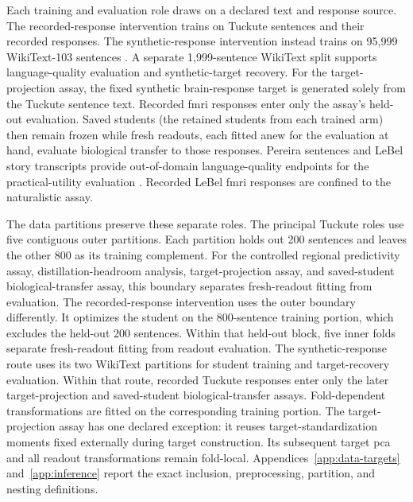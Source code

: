 Each training and evaluation role draws on a declared text and response source.
The recorded-response intervention trains on Tuckute sentences and their recorded responses.
The synthetic-response intervention instead trains on 95,999 WikiText-103 sentences \autocite{merity2017}.
A separate 1,999-sentence WikiText split supports language-quality evaluation and synthetic-target recovery.
For the target-projection assay, the fixed synthetic brain-response target is generated solely from the Tuckute sentence text.
Recorded \ac{fmri} responses enter only the assay's held-out evaluation.
Saved students (the retained students from each trained arm) then remain frozen while fresh readouts, each fitted anew for the evaluation at hand, evaluate biological transfer to those responses.
Pereira sentences and LeBel story transcripts provide out-of-domain language-quality endpoints for the practical-utility evaluation \autocite{pereira2018,lebel2023}.
Recorded LeBel \ac{fmri} responses are confined to the naturalistic assay.

The data partitions preserve these separate roles.
The principal Tuckute roles use five contiguous outer partitions.
Each partition holds out 200 sentences and leaves the other 800 as its training complement.
For the controlled regional predictivity assay, distillation-headroom analysis, target-projection assay, and saved-student biological-transfer assay, this boundary separates fresh-readout fitting from evaluation.
The recorded-response intervention uses the outer boundary differently.
It optimizes the student on the 800-sentence training portion, which excludes the held-out 200 sentences.
Within that held-out block, five inner folds separate fresh-readout fitting from readout evaluation.
The synthetic-response route uses its two WikiText partitions for student training and target-recovery evaluation.
Within that route, recorded Tuckute responses enter only the later target-projection and saved-student biological-transfer assays.
Fold-dependent transformations are fitted on the corresponding training portion.
The target-projection assay has one declared exception: it reuses target-standardization moments fixed externally during target construction.
Its subsequent target \ac{pca} and all readout transformations remain fold-local.
Appendices~\ref{app:data-targets} and~\ref{app:inference} report the exact inclusion, preprocessing, partition, and nesting definitions.

